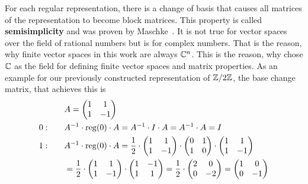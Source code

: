 For each regular representation, there is a change of basis that causes all matrices of the representation to become block matrices.
This property is called \textbf{semisimplicity}  and was proven by Maschke~\cite{Maschke1899}.
It is not true for vector spaces over the field of rational numbers but is for complex numbers.
That is the reason, why finite vector spaces in this work are always $\mathbb{C}^n$.
This is the reason, why chose $\mathbb{C}$ as the field for defining finite vector spaces and matrix properties.
As an example for our previously constructed representation of $\mathbb{Z}/2\mathbb{Z}$, the base change matrix, that achieves this is
\begin{align*}
    & A = \begin{pmatrix}
        1 & 1 \\
        1 & -1
    \end{pmatrix} \\
    0: \qquad & A^{-1} \cdot \operatorname{reg}(0) \cdot A = A^{-1} \cdot I \cdot A = A^{-1} \cdot A = I \\
    1: \qquad & A^{-1} \cdot \operatorname{reg}(0) \cdot A = \frac{1}{2} \cdot \begin{pmatrix}
        1 & 1 \\
        1 & -1
    \end{pmatrix} \cdot \begin{pmatrix}
        0 & 1 \\
        1 & 0
    \end{pmatrix} \cdot \begin{pmatrix}
        1 & 1 \\
        1 & -1
    \end{pmatrix} \\
    & = \frac{1}{2} \cdot \begin{pmatrix}
        1 & 1 \\
        1 & -1
    \end{pmatrix} \cdot \begin{pmatrix}
        1 & -1 \\
        1 & 1
    \end{pmatrix} = \frac{1}{2} \cdot \begin{pmatrix}
        2 & 0 \\
        0 & -2
    \end{pmatrix} = \begin{pmatrix}
        1 & 0 \\
        0 & -1
    \end{pmatrix}
\end{align*}
